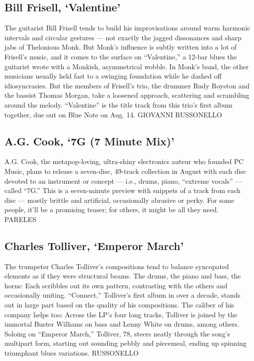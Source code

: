 \hypertarget{bill-frisell-valentine}{%
\subsection{Bill Frisell, `Valentine'}\label{bill-frisell-valentine}}

The guitarist Bill Frisell tends to build his improvisations around warm
harmonic intervals and circular gestures --- not exactly the jagged
dissonances and sharp jabs of Thelonious Monk. But Monk's influence is
subtly written into a lot of Frisell's music, and it comes to the
surface on ``Valentine,'' a 12-bar blues the guitarist wrote with a
Monkish, asymmetrical wobble. In Monk's band, the other musicians
usually held fast to a swinging foundation while he dashed off
idiosyncrasies. But the members of Frisell's trio, the drummer Rudy
Royston and the bassist Thomas Morgan, take a loosened approach,
scattering and scrambling around the melody. ``Valentine'' is the title
track from this trio's first album together, due out on Blue Note on
Aug. 14. GIOVANNI RUSSONELLO

\hypertarget{ag-cook-7g-7-minute-mix}{%
\subsection{A.G. Cook, `7G (7 Minute
Mix)'}\label{ag-cook-7g-7-minute-mix}}

A.G. Cook, the metapop-loving, ultra-shiny electronics auteur who
founded PC Music, plans to release a seven-disc, 49-track collection in
August with each disc devoted to an instrument or concept --- i.e.,
drums, piano, ``extreme vocals'' --- called ``7G.'' This is a
seven-minute preview with snippets of a track from each disc --- mostly
brittle and artificial, occasionally abrasive or perky. For some people,
it'll be a promising teaser; for others, it might be all they need.
PARELES

\hypertarget{charles-tolliver-emperor-march}{%
\subsection{Charles Tolliver, `Emperor
March'}\label{charles-tolliver-emperor-march}}

The trumpeter Charles Tolliver's compositions tend to balance syncopated
elements as if they were structural beams. The drums, the piano and
bass, the horns: Each scribbles out its own pattern, contrasting with
the others and occasionally uniting. ``Connect,'' Tolliver's first album
in over a decade, stands out in large part based on the quality of his
compositions. The caliber of his company helps too: Across the LP's four
long tracks, Tolliver is joined by the immortal Buster Williams on bass
and Lenny White on drums, among others. Soloing on ``Emperor March,''
Tolliver, 78, steers neatly through the song's multipart form, starting
out sounding pebbly and piecemeal, ending up spinning triumphant blues
variations. RUSSONELLO


